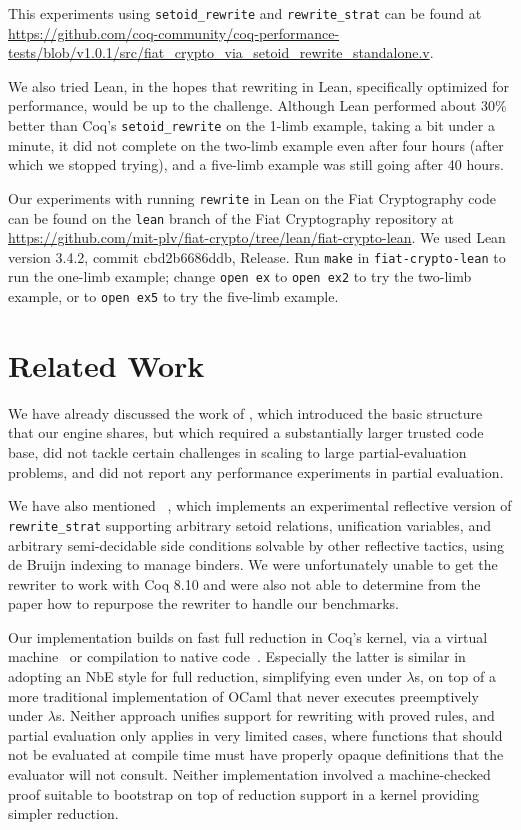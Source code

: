 This experiments using \verb|setoid_rewrite| and \verb|rewrite_strat| can be found at \url{https://github.com/coq-community/coq-performance-tests/blob/v1.0.1/src/fiat_crypto_via_setoid_rewrite_standalone.v}.

We also tried Lean, in the hopes that rewriting in Lean, specifically optimized for performance, would be up to the challenge.
Although Lean performed about 30\% better than Coq's \texttt{setoid\_rewrite} on the 1-limb example, taking a bit under a minute, it did not complete on the two-limb example even after four hours (after which we stopped trying), and a five-limb example was still going after 40 hours.

Our experiments with running \texttt{rewrite} in Lean on the Fiat Cryptography code can be found on the \texttt{lean} branch of the Fiat Cryptography repository at \url{https://github.com/mit-plv/fiat-crypto/tree/lean/fiat-crypto-lean}.
We used Lean version 3.4.2, commit cbd2b6686ddb, Release.
Run \texttt{make} in \texttt{fiat-crypto-lean} to run the one-limb example;
change \texttt{open ex} to \texttt{open ex2} to try the two-limb example, or to \texttt{open ex5} to try the five-limb example.

\section{Related Work}\label{sec:related}

We have already discussed the work of \textcite{Aehlig}, which introduced the basic structure that our engine shares, but which required a substantially larger trusted code base, did not tackle certain challenges in scaling to large partial-evaluation problems, and did not report any performance experiments in partial evaluation.

We have also mentioned \Rtac{}~\cite{rtac}, which implements an experimental reflective version of \texttt{rewrite\_strat} supporting arbitrary setoid relations, unification variables, and arbitrary semi-decidable side conditions solvable by other reflective tactics, using de Bruijn indexing to manage binders.
We were unfortunately unable to get the rewriter to work with Coq 8.10 and were also not able to determine from the paper how to repurpose the rewriter to handle our benchmarks.

Our implementation builds on fast full reduction in Coq's kernel, via a virtual machine~\cite{vmcompute} or compilation to native code~\cite{nativecompute}.
Especially the latter is similar in adopting an NbE style for full reduction, simplifying even under $\lambda$s, on top of a more traditional implementation of OCaml that never executes preemptively under $\lambda$s.
Neither approach unifies support for rewriting with proved rules, and partial evaluation only applies in very limited cases, where functions that should not be evaluated at compile time must have properly opaque definitions that the evaluator will not consult.
Neither implementation involved a machine-checked proof suitable to bootstrap on top of reduction support in a kernel providing simpler reduction.

